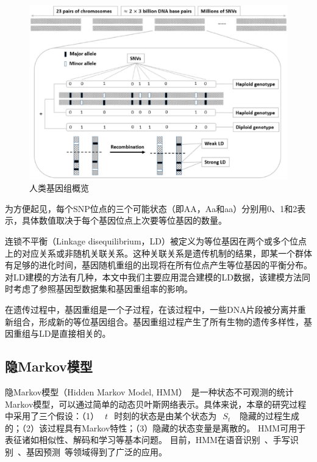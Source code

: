 \begin{figure}[htbp]
	\centering
	\includegraphics[width = 0.9\linewidth]{./figures/Fig1-human-genomic-overview.eps}
	\caption{人类基因组概览~\cite{samani2015quantifying}
	}
	\label{fig:human-genomic-overview}
\end{figure}

为方便起见，每个SNP位点的三个可能状态（即AA，Aa和aa）分别用0、1和2表示，具体数值取决于每个基因位点上次要等位基因的数量。

连锁不平衡（Linkage disequilibrium，LD）被定义为等位基因在两个或多个位点上的对应关系或非随机关联关系。这种关联关系是遗传机制的结果，即某一个群体有足够的进化时间，基因随机重组的出现将在所有位点产生等位基因的平衡分布。对LD建模的方法有几种，本文中我们主要应用混合建模的LD数据，该建模方法同时考虑了参照基因型数据集和基因重组率的影响。

在遗传过程中，基因重组是一个子过程，在该过程中，一些DNA片段被分离并重新组合，形成新的等位基因组合。基因重组过程产生了所有生物的遗传多样性，基因重组与LD是直接相关的。

\subsection{隐Markov模型}

隐Markov模型（Hidden Markov Model, HMM）~\cite{rabiner1989tutorial,stamp2004revealing}是一种状态不可观测的统计Markov模型，可以通过简单的动态贝叶斯网络表示。具体来说，本章的研究过程中采用了三个假设：（1）~$~t~$~时刻的状态是由某个状态为~$~S_t~$~ 隐藏的过程生成的；（2）该过程具有Markov特性；（3）隐藏的状态变量是离散的。
HMM可用于表征诸如相似性、解码和学习等基本问题。 目前，HMM在语音识别~\cite{rabiner1989tutorial}、手写识别~\cite{hu1996hmm}、基因预测~\cite{durbin1998biological}等领域得到了广泛的应用。

